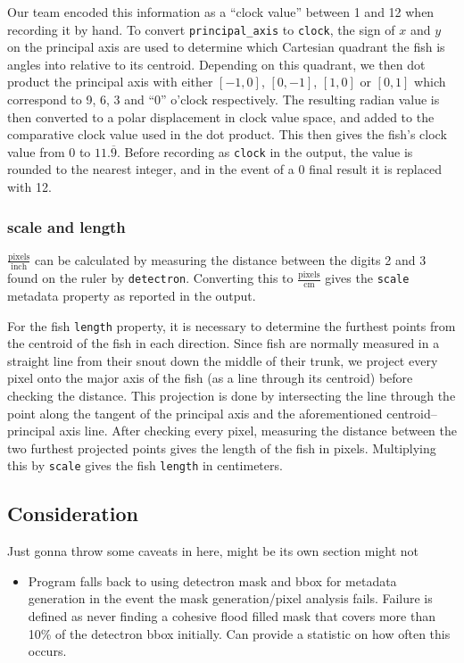 \documentclass[screen,review]{acmart}
\begin{document}
Our team encoded this information as a ``clock value'' between 1 and 12 when recording it by hand. To convert \verb|principal_axis| to \verb|clock|, the sign of \(x\) and \(y\) on the principal axis are used to determine which Cartesian quadrant the fish is angles into relative to its centroid. Depending on this quadrant, we then dot product the principal axis with either \([-1,0]\), \([0,-1]\), \([1,0]\) or \([0,1]\) which correspond to 9, 6, 3 and ``0'' o'clock respectively. The resulting radian value is then converted to a polar displacement in clock value space, and added to the comparative clock value used in the dot product. This then gives the fish's clock value from 0 to \(11.\overline{9}\). Before recording as \verb|clock| in the output, the value is rounded to the nearest integer, and in the event of a 0 final result it is replaced with 12.
\subsubsection{scale and length}
\(\frac{\mathrm{pixels}}{\mathrm{inch}}\) can be calculated by measuring the distance between the digits 2 and 3 found on the ruler by \verb|detectron|. Converting this to \(\frac{\mathrm{pixels}}{\mathrm{cm}}\) gives the \verb|scale| metadata property as reported in the output.

For the fish \verb|length| property, it is necessary to determine the furthest points from the centroid of the fish in each direction. Since fish are normally measured in a straight line from their snout down the middle of their trunk, we project every pixel onto the major axis of the fish (as a line through its centroid) before checking the distance. This projection is done by intersecting the line through the point along the tangent of the principal axis and the aforementioned centroid--principal axis line. After checking every pixel, measuring the distance between the two furthest projected points gives the length of the fish in pixels. Multiplying this by \verb|scale| gives the fish \verb|length| in centimeters.
\subsection{Consideration}
Just gonna throw some caveats in here, might be its own section might not
\begin{itemize}
    \item Program falls back to using detectron mask and bbox for metadata generation in the event the mask generation/pixel analysis fails. Failure is defined as never finding a cohesive flood filled mask that covers more than 10\% of the detectron bbox initially. Can provide a statistic on how often this occurs.
\end{itemize}
\end{document}
